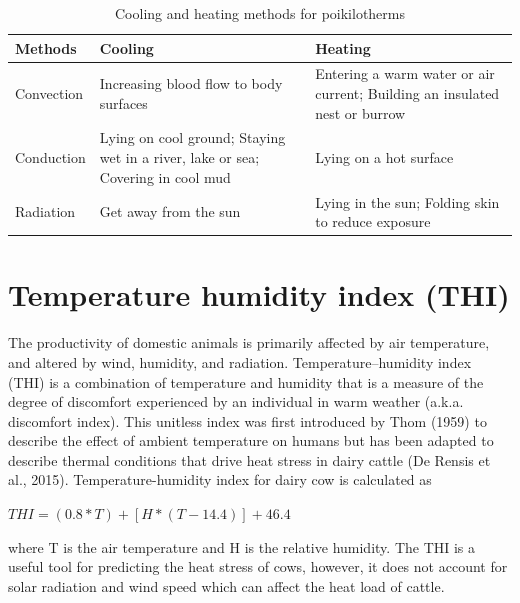 \documentclass[]{book}
\begin{document}
\begin{table}

\caption{\label{tab:cooling}Cooling and heating methods for poikilotherms}
\centering
\begin{tabular}[t]{lll}
\toprule
Methods & Cooling & Heating\\
\midrule
Convection & Increasing blood flow to body surfaces & Entering a warm water or air current; Building an insulated nest or burrow\\
Conduction & Lying on cool ground; Staying wet in a river, lake or sea; Covering in cool mud & Lying on a hot surface\\
Radiation & Get away from the sun & Lying in the sun; Folding skin to reduce exposure\\
\bottomrule
\end{tabular}
\end{table}

\section{Temperature humidity index
(THI)}\label{temperature-humidity-index-thi}

The productivity of domestic animals is primarily affected by air
temperature, and altered by wind, humidity, and radiation.
Temperature--humidity index (THI) is a combination of temperature and
humidity that is a measure of the degree of discomfort experienced by an
individual in warm weather (a.k.a. discomfort index). This unitless
index was first introduced by Thom (1959) to describe the effect of
ambient temperature on humans but has been adapted to describe thermal
conditions that drive heat stress in dairy cattle (De Rensis et al.,
2015). Temperature-humidity index for dairy cow is calculated as

\(THI = (0.8*T) + [H*(T - 14.4)] + 46.4\)

where T is the air temperature and H is the relative humidity. The THI
is a useful tool for predicting the heat stress of cows, however, it
does not account for solar radiation and wind speed which can affect the
heat load of cattle.
\end{document}
